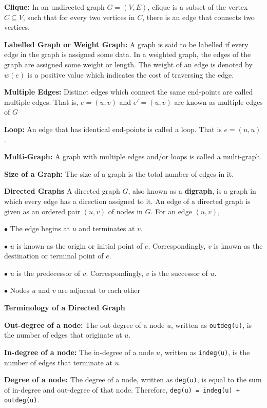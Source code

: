 \vskip 3mm
{\bf Clique:} In an undirected graph $G=(V,E)$, clique is a subset of the vertex $C\subseteq V$, such that for every two vertices in $C$, there is an edge that connects two vertices.

\vskip 3mm
{\bf Labelled Graph or Weight Graph:} A graph is said to be labelled if every edge in the graph is assigned some data. In a weighted graph, the edges of the graph are assigned some weight or length. The  weight of an edge is denoted by $w(e)$ is a positive value which indicates the cost of traversing the edge.

\vskip 3mm
{\bf Multiple Edges:} Distinct edges which connect the same end-points are called multiple edges. That is, $e=(u,v)$ and $e'=(u,v)$ are known as multiple edges of $G$

\vskip 3mm
{\bf Loop:} An edge that has identical end-points is called a loop. That is $e=(u,u)$.

\vskip 3mm
{\bf Multi-Graph:} A graph with multiple edges and/or loops is called a multi-graph.

\vskip 3mm
{\bf Size of a Graph:} The size of a graph is the total number of edges in it.

\filbreak
\vskip 1cm
{\bf Directed Graphs}
\vskip 1mm
A directed graph $G$, also known as a {\bf digraph}, is a graph in which every edge has a direction assigned to it. An edge of a directed graph is given as an ordered pair $(u,v)$ of nodes in $G$. For an edge $(u,v)$,

\vskip 2mm
\qquad$\bullet$ The edge begins at $u$ and terminates at $v$.

\vskip 3mm
\qquad$\bullet$ $u$ is known as the origin or initial point of $e$. Correspondingly, $v$ is known as the destination or terminal point of $e$.

\vskip 3mm
\qquad$\bullet$ $u$ is the predecessor of $v$. Correspondingly, $v$ is the successor of $u$.

\vskip 3mm
\qquad$\bullet$ Nodes $u$ and $v$ are adjacent to each other

\vskip 3mm
{\bf Terminology of a Directed Graph}

\vskip 1mm
{\bf Out-degree of a node:} The out-degree of a node $u$, written as {\tt outdeg(u)}, is the number of edges that originate at $u$.

\vskip 3mm
{\bf In-degree of a node:} The in-degree of a node $u$, written as {\tt indeg(u)}, is the number of edges that terminate at $u$.

\vskip 3mm
{\bf Degree of a node:} The degree of a node, written as {\tt deg(u)}, is equal to the sum of in-degree and out-degree of that node. Therefore, {\tt deg(u) = indeg(u) + outdeg(u)}.

